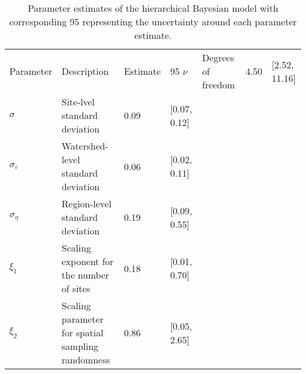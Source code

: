 \begin{table}[ht]
\centering
\caption{Parameter estimates of the hierarchical Bayesian model 
             with corresponding 95%
             representing the uncertainty around each parameter estimate.
             \label{tab:parms-est}} 
\begingroup\small
\begin{tabularx}{\textwidth}{llll}
  \hline
Parameter & Description & Estimate & 95%
  \hline
$\nu$ & Degrees of freedom & 4.50 & [2.52, 11.16] \\ 
  $\sigma$ & Site-lvel standard deviation & 0.09 & [0.07, 0.12] \\ 
  $\sigma_{\varepsilon}$ & Watershed-level standard deviation & 0.06 & [0.02, 0.11] \\ 
  $\sigma_{\eta}$ & Region-level standard deviation & 0.19 & [0.09, 0.55] \\ 
  $\xi_{1}$ & Scaling exponent for the number of sites & 0.18 & [0.01, 0.70] \\ 
  $\xi_{2}$ & Scaling parameter for spatial sampling randomness & 0.86 & [0.05, 2.65] \\ 
   \hline
\end{tabularx}
\endgroup
\end{table}
